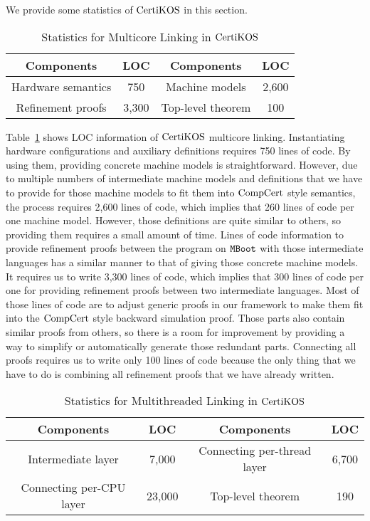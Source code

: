 We provide some statistics of $\mathrm{CertiKOS}$ in this section. 
\begin{table}
\begin{center}
\renewcommand{\arraystretch}{1.1}
\setlength{\tabcolsep}{0.3em}
\begin{tabular}{|c|c||c|c|}
\hline
Components  & LOC & Components  & LOC \\
\hline
\hline
Hardware semantics & 750 &
Machine models & 2,600 \\ 
\hline
Refinement proofs & 3,300 & Top-level theorem & 100\\ 
\hline
\end{tabular}
\end{center}
\caption{Statistics for Multicore Linking in $\mathrm{CertiKOS}$}
\label{table:multicore-evaluation}
\hrulefill
\end{table}
Table~\ref{table:multicore-evaluation} shows LOC information of $\mathrm{CertiKOS}$ multicore linking.
Instantiating hardware configurations and auxiliary definitions requires 750 lines of code. 
By using them, providing concrete machine models is straightforward.
However, due to multiple numbers of intermediate machine models and  definitions that we have to provide for those machine models to fit them into $\mathrm{CompCert}$ style semantics, the process requires 2,600 lines of code, which implies that 260 lines of code per one machine model.
However, those definitions are quite similar to others, so providing them requires a small amount of time. 
Lines of code information to provide refinement proofs between the program on ${\mathrm{\texttt{MBoot}}}$ with those intermediate languages has a similar manner to that of giving those concrete machine models. 
It requires us to write 3,300 lines of code, which implies that 300 lines of code per one for providing refinement proofs between two intermediate languages. 
Most of those lines of code are to adjust generic proofs in our framework to make them fit into the $\mathrm{CompCert}$ style backward simulation proof. 
Those parts also contain similar proofs from others, so there is a room for improvement by providing a way to simplify or automatically generate those redundant parts. 
Connecting all proofs requires us to write only 100 lines of code because the only thing that we have to do is combining all refinement proofs that we have already written. 
\begin{table}
\begin{center}
\renewcommand{\arraystretch}{1.1}
\setlength{\tabcolsep}{0.3em}
\begin{tabular}{|c|c||c|c|}
\hline
Components  & LOC & Components  & LOC \\
\hline
\hline
Intermediate layer & 7,000 &
Connecting per-thread layer & 6,700 \\ 
\hline
Connecting per-CPU layer & 23,000 & Top-level theorem & 190\\ 
\hline
\end{tabular}
\end{center}
\caption{Statistics for Multithreaded Linking in $\mathrm{CertiKOS}$}
\label{table:multithreaded-evaluation}
\hrulefill
\end{table}
